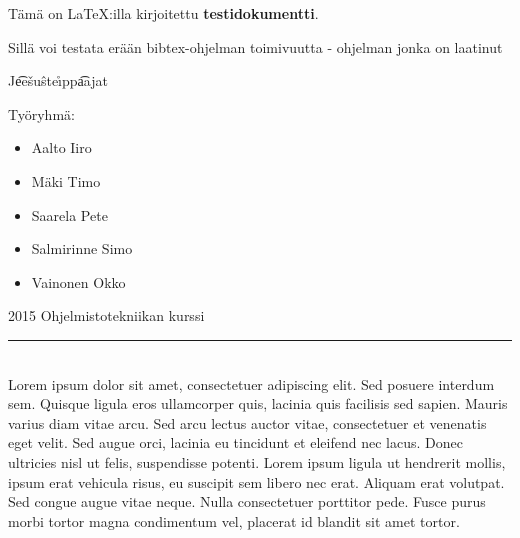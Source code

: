 \documentclass[a4paper,12pt]{article}
\begin{document}
Tämä on \LaTeX:illa kirjoitettu \textbf{testidokumentti}.

Sillä voi testata erään bibtex-ohjelman toimivuutta - ohjelman jonka on laatinut\\ 
\begin{center}{ 
{\huge J\t{ee}\v{s}u\^{s}te\r{\i}pp\t{aa}jat}
\\
}\end{center}

 Työryhmä: 
 \begin{itemize}
    \item
       Aalto Iiro
    \item 
       Mäki Timo
    \item 
       Saarela Pete
    \item
       Salmirinne Simo
    \item
       Vainonen Okko
 \end{itemize}

 2015 Ohjelmistotekniikan kurssi\\[1cm]
\noindent\rule{14cm}{0.4pt}\\[1cm]
Lorem ipsum dolor sit amet, consectetuer adipiscing elit\cite{K}. Sed posuere interdum sem. Quisque ligula eros ullamcorper quis, lacinia quis facilisis sed sapien. Mauris varius diam vitae arcu. Sed arcu lectus auctor vitae, consectetuer et venenatis eget velit\cite{HM06}. Sed augue orci, lacinia eu tincidunt et eleifend nec lacus. Donec ultricies nisl ut felis, suspendisse potenti. Lorem ipsum ligula ut hendrerit mollis, ipsum erat vehicula risus, eu suscipit sem libero nec erat. Aliquam erat volutpat. Sed congue augue vitae neque. Nulla consectetuer porttitor pede. Fusce purus morbi tortor magna condimentum vel, placerat id blandit sit amet tortor.

{}

\end{document}
